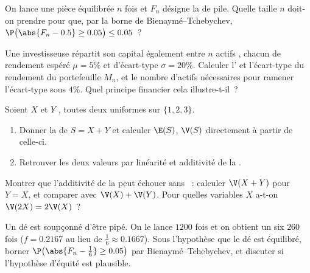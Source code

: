 \begin{exercise}[$\star$]\label{exo:g12:sums:3}
On lance une pièce équilibrée $n$ fois et $F_n$ désigne la  de
pile. Quelle taille $n$ doit-on prendre pour que, par la borne de
Bienaymé--Tchebychev,
$\P\bigl(\abs{F_n - 0.5} \geq 0.05\bigr) \leq 0.05$~?
\end{exercise}

\begin{exercise}[$\star\star$]\label{exo:g12:sums:4}
Une investisseuse répartit son capital également entre $n$ actifs
, chacun de rendement espéré $\mu = 5\%$ et d'écart-type
$\sigma = 20\%$. Calculer l' et l'écart-type du rendement du
portefeuille $M_n$, et le nombre d'actifs nécessaires pour ramener
l'écart-type sous $4\%$. Quel principe financier cela illustre-t-il~?
\end{exercise}

\begin{exercise}[$\star\star$]\label{exo:g12:sums:5}
Soient $X$ et $Y$ , toutes deux uniformes sur $\{1, 2, 3\}$.
\begin{enumerate}
  \item Donner la  de $S = X + Y$ et calculer $\E(S)$, $\V(S)$
        directement à partir de celle-ci.
  \item Retrouver les deux valeurs par linéarité et additivité de la
        .
\end{enumerate}
\end{exercise}

\begin{exercise}[$\star\star$]\label{exo:g12:sums:6}
Montrer que l'additivité de la  peut échouer sans ~:
calculer $\V(X + Y)$ pour $Y = X$, et comparer avec $\V(X) + \V(Y)$. Pour
quelles variables $X$ a-t-on $\V(2X) = 2\V(X)$~?
\end{exercise}

\begin{exercise}[$\star\star$]\label{exo:g12:sums:7}
Un dé est soupçonné d'être pipé. On le lance $1200$ fois et on obtient un
six $260$ fois ($f = 0.2167$ au lieu de $\frac16 \approx 0.1667$). Sous
l'hypothèse que le dé est équilibré, borner
$\P\bigl(\abs{F_n - \frac16} \geq 0.05\bigr)$ par Bienaymé--Tchebychev, et
discuter si l'hypothèse d'équité est plausible.
\end{exercise}

